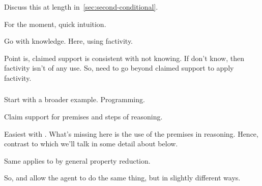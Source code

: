\begin{note}
  Discuss this at length in~\ref{sec:second-conditional}.
\end{note}

\begin{note}
  For the moment, quick intuition.

  Go with knowledge.
  Here, using factivity.

  Point is, claimed support is consistent with not knowing.
  If don't know, then factivity isn't of any use.
  So, need to go beyond claimed support to apply factivity.
\end{note}

\subsubsection{\ur{}}
\label{sec:ur-1}

\begin{note}
  Start with a broader example.
  Programming.
\end{note}



\begin{note}
  Claim support for premises and steps of reasoning.

  Easiest with \WR{}.
  What's missing here is the use of the premises in reasoning.
  Hence, contrast to \ESU{} which we'll talk in some detail about below.
  

  Same applies to \AR{} by general property reduction.

  So, \AR{} and \WR{} allow the agent to do the same thing, but in slightly different ways.
\end{note}


